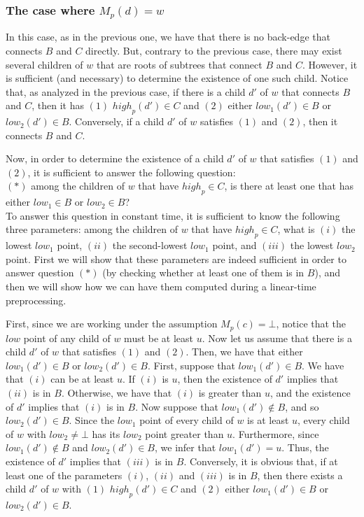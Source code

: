 \documentclass[11pt,a4paper]{article}
\begin{document}
\subsubsection{The case where $M_p(d)=w$}
\label{section:M(d)=w,M(c)=bot}
In this case, as in the previous one, we have that there is no back-edge that connects $B$ and $C$ directly. But, contrary to the previous case, there may exist several children of $w$ that are roots of subtrees that connect $B$ and $C$. However, it is sufficient (and necessary) to determine the existence of one such child. Notice that, as analyzed in the previous case, if there is a child $d'$ of $w$ that connects $B$ and $C$, then it has $(1)$ $\mathit{high}_p(d')\in C$ and $(2)$ either $\mathit{low}_1(d')\in B$ or $\mathit{low}_2(d')\in B$. Conversely, if a child $d'$ of $w$ satisfies $(1)$ and $(2)$, then it connects $B$ and $C$.

Now, in order to determine the existence of a child $d'$ of $w$ that satisfies $(1)$ and $(2)$, it is sufficient to answer the following question:\\

$(*)$ among the children of $w$ that have $\mathit{high}_p\in C$, is there at least one that has either $\mathit{low}_1\in B$ or $\mathit{low}_2\in B$?\\

To answer this question in constant time, it is sufficient to know the following three parameters: among the children of $w$ that have $\mathit{high}_p\in C$, what is $(i)$ the lowest $\mathit{low}_1$ point, $(ii)$ the second-lowest $\mathit{low}_1$ point, and $(iii)$ the lowest $\mathit{low}_2$ point. First we will show that these parameters are indeed sufficient in order to answer question $(*)$ (by checking whether at least one of them is in $B$), and then we will show how we can have them computed during a linear-time preprocessing.

First, since we are working under the assumption $M_p(c)=\bot$, notice that the $\mathit{low}$ point of any child of $w$ must be at least $u$. Now let us assume that there is a child $d'$ of $w$ that satisfies $(1)$ and $(2)$. Then, we have that either $\mathit{low}_1(d')\in B$ or $\mathit{low}_2(d')\in B$. First, suppose that $\mathit{low}_1(d')\in B$. We have that $(i)$ can be at least $u$. If $(i)$ is $u$, then the existence of $d'$ implies that $(ii)$ is in $B$. Otherwise, we have that $(i)$ is greater than $u$, and the existence of $d'$ implies that $(i)$ is in $B$. Now suppose that $\mathit{low}_1(d')\notin B$, and so $\mathit{low}_2(d')\in B$. Since the $\mathit{low}_1$ point of every child of $w$ is at least $u$, every child of $w$ with $\mathit{low}_2\neq\bot$ has its $\mathit{low}_2$ point greater than $u$. Furthermore, since $\mathit{low}_1(d')\notin B$ and $\mathit{low}_2(d')\in B$, we infer that $\mathit{low}_1(d')=u$. Thus, the existence of $d'$ implies that $(iii)$ is in $B$. Conversely, it is obvious that, if at least one of the parameters $(i)$, $(ii)$ and $(iii)$ is in $B$, then there exists a child $d'$ of $w$ with $(1)$ $\mathit{high}_p(d')\in C$ and $(2)$ either $\mathit{low}_1(d')\in B$ or $\mathit{low}_2(d')\in B$.
\end{document}
